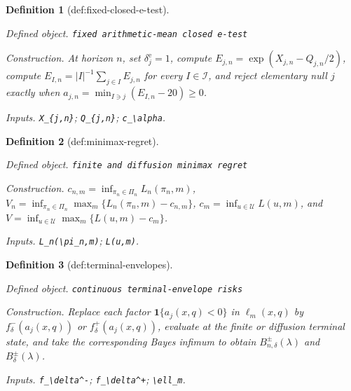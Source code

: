 \documentclass{article}
\newtheorem{definition}{Definition}
\begin{document}
\begin{definition}[def:fixed-closed-e-test]\label{def:fixed-closed-e-test}
\par\smallskip\noindent\emph{Defined object.} \texttt{fixed arithmetic-\allowbreak{}mean closed e-\allowbreak{}test}
\par\smallskip\noindent\emph{Construction.} At horizon \(n\), set \(\delta_j^{\mathrm e}=1\), compute \(E_{j,n}=\exp(X_{j,n}-Q_{j,n}/2)\), compute \(E_{I,n}=|I|^{-1}\sum_{j\in I}E_{j,n}\) for every \(I\in\mathcal I\), and reject elementary null \(j\) exactly when \(a_{j,n}=\min_{I\ni j}(E_{I,n}-20)\geq0\).
\par\smallskip\noindent\emph{Inputs.} \texttt{X\_\allowbreak{}\{j,\allowbreak{}n\}\allowbreak{}}; \texttt{Q\_\allowbreak{}\{j,\allowbreak{}n\}\allowbreak{}}; \texttt{c\_\allowbreak{}\textbackslash{}\allowbreak{}alpha}.
\end{definition}

\begin{definition}[def:minimax-regret]\label{def:minimax-regret}
\par\smallskip\noindent\emph{Defined object.} \texttt{finite and diffusion minimax regret}
\par\smallskip\noindent\emph{Construction.} \(c_{n,m}=\inf_{\pi_n\in\Pi_n}L_n(\pi_n,m)\), \(V_n=\inf_{\pi_n\in\Pi_n}\max_m\{L_n(\pi_n,m)-c_{n,m}\}\), \(c_m=\inf_{u\in\mathcal U}L(u,m)\), and \(V=\inf_{u\in\mathcal U}\max_m\{L(u,m)-c_m\}\).
\par\smallskip\noindent\emph{Inputs.} \texttt{L\_\allowbreak{}n(\textbackslash{}\allowbreak{}pi\_\allowbreak{}n,\allowbreak{}m)}; \texttt{L(u,\allowbreak{}m)}.
\end{definition}

\begin{definition}[def:terminal-envelopes]\label{def:terminal-envelopes}
\par\smallskip\noindent\emph{Defined object.} \texttt{continuous terminal-\allowbreak{}envelope risks}
\par\smallskip\noindent\emph{Construction.} Replace each factor \(\mathbf 1\{a_j(x,q)<0\}\) in \(\ell_m(x,q)\) by \(f_\delta^-(a_j(x,q))\) or \(f_\delta^+(a_j(x,q))\), evaluate at the finite or diffusion terminal state, and take the corresponding Bayes infimum to obtain \(B_{n,\delta}^{\pm}(\lambda)\) and \(B_\delta^{\pm}(\lambda)\).
\par\smallskip\noindent\emph{Inputs.} \texttt{f\_\allowbreak{}\textbackslash{}\allowbreak{}delta\textasciicircum{}-\allowbreak{}}; \texttt{f\_\allowbreak{}\textbackslash{}\allowbreak{}delta\textasciicircum{}+\allowbreak{}}; \texttt{\textbackslash{}\allowbreak{}ell\_\allowbreak{}m}.
\end{definition}
\end{document}
